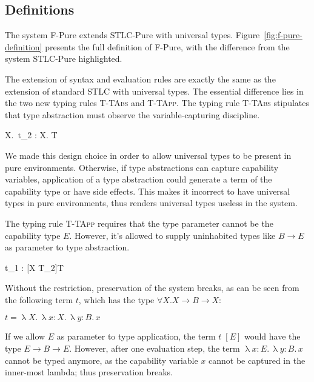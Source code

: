 \subsection{Definitions}

The system F-Pure extends STLC-Pure with universal
types. Figure~\ref{fig:f-pure-definition} presents the full definition
of F-Pure, with the difference from the system STLC-Pure highlighted.

The extension of syntax and evaluation rules are exactly the same as
the extension of standard STLC with universal types.  The essential
difference lies in the two new typing rules \textsc{T-TAbs} and
\textsc{T-TApp}. The typing rule \textsc{T-TAbs} stipulates that type
abstraction must observe the variable-capturing discipline.

{ \Gamma \vdash \uplambda X.\, t_2 : \forall X. T }

We made this design choice in order to allow universal types to be
present in pure environments. Otherwise, if type abstractions can
capture capability variables, application of a type abstraction could
generate a term of the capability type or have side effects. This
makes it incorrect to have universal types in pure environments, thus
renders universal types useless in the system.

The typing rule \textsc{T-TApp} requires that the type parameter
cannot be the capability type $E$. However, it's allowed to supply
uninhabited types like $B \to E$ as parameter to type abstraction.


{ \Gamma \vdash t_1 \; [T_2] : [X \mapsto T_2]T }

Without the restriction, preservation of the system breaks, as can be
seen from the following term $t$, which has the type
$\forall X. X \to B \to X$:

\begin{center}
  $t = \uplambda X. \, \uplambda x{:}X. \, \uplambda y{:}B. \, x$
\end{center}

If we allow $E$ as parameter to type application, the term $t \; [E]$
would have the type $E \to B \to E$. However, after one evaluation
step, the term $\uplambda x{:}E. \, \uplambda y{:}B. \, x$ cannot be
typed anymore, as the capability variable $x$ cannot be captured in
the inner-most lambda; thus preservation breaks.

